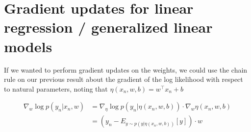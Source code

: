 \documentclass[a4paper]{article}
\begin{document}
\section{Gradient updates for linear regression / generalized linear models}

If we wanted to perform gradient updates on the weights, we could use the chain rule on our previous result about the gradient of the log likelihood with respect to natural parameters, noting that $\eta(x_n,w,b) = w^\intercal x_n + b$

\begin{equation}
  \begin{split}
    \nabla_w \log p( y_n \vert x_n, w) &= \nabla_{\eta} \log p( y_n \vert \eta(x_n,w,b)) \cdot \nabla_w \eta(x_n,w,b) \\
    &= \left( y_n - E_{ y \sim p( y \vert \eta(x_n,w,b))} \left[ y \right] \right) \cdot w
  \end{split}
  \label{}
\end{equation}
\end{document}
